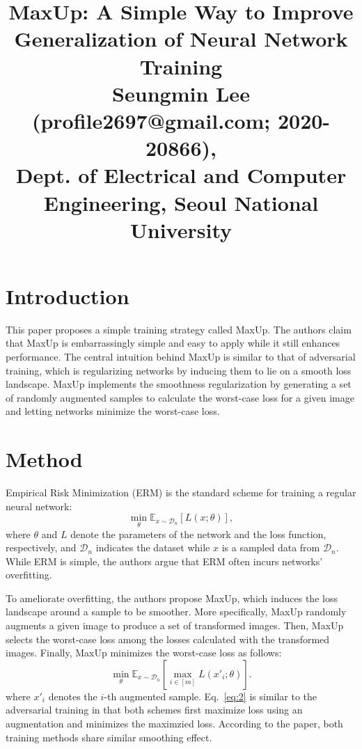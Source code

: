\documentclass[10pt,twocolumn,letterpaper]{article}
\begin{document}
\title{MaxUp: A Simple Way to Improve Generalization of Neural Network Training\\ {\rm {\normalsize Seungmin Lee (profile2697@gmail.com; 2020-20866), \\Dept. of Electrical and Computer Engineering, Seoul National University}}}   %

\maketitle
\thispagestyle{empty}

\section{Introduction}\label{sec:introduction}
This paper proposes a simple training strategy called MaxUp. The authors claim that MaxUp is embarrassingly simple and easy to apply while it still enhances performance. The central intuition behind MaxUp is similar to that of adversarial training, which is regularizing networks by inducing them to lie on a smooth loss landscape. MaxUp implements the smoothness regularization by generating a set of randomly augmented samples to calculate the worst-case loss for a given image and letting networks minimize the worst-case loss.

\section{Method}
Empirical Risk Minimization (ERM) is the standard scheme for training a regular neural network:
\begin{equation}
	\label{eq:1}
	\min_{\theta} \mathbb{E}_{x \sim \mathcal{D}_n} \left[ L (x; \theta)\right],
\end{equation}
where $\theta$ and $L$ denote the parameters of the network and the loss function, respectively, and $\mathcal{D}_n$ indicates the dataset while $x$ is a sampled data from $\mathcal{D}_n$. While ERM is simple, the authors argue that ERM often incurs networks' overfitting.

To ameliorate overfitting, the authors propose MaxUp, which induces the loss landscape around a sample to be smoother. More specifically, MaxUp randomly augments a given image to produce a set of transformed images. Then, MaxUp selects the worst-case loss among the losses calculated with the transformed images. Finally, MaxUp minimizes the worst-case loss as follows:
\begin{equation}
    \label{eq:2}
    \min_{\theta} \mathbb{E}_{x \sim \mathcal{D}_n} \left[ \max_{i \in [m]}L (x'_i; \theta)\right].
\end{equation}
where $x'_i$ denotes the $i$-th augmented sample. Eq.~\ref{eq:2}  is similar to the adversarial training in that both schemes first maximize loss using an augmentation and minimizes the maximzied loss. According to the paper, both training methods share similar smoothing effect.
\end{document}
